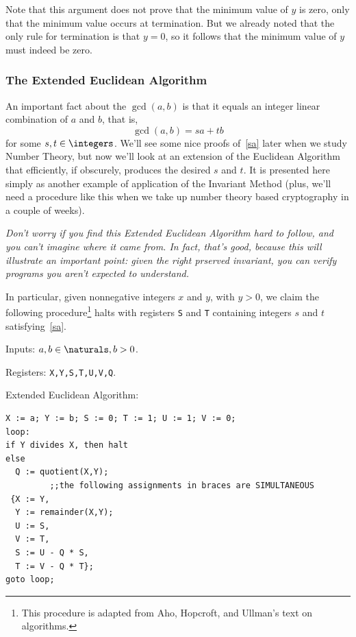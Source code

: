 Note that this argument does not prove that the minimum value of $y$ is
zero, only that the minimum value occurs at termination.  But we already
noted that the only rule for termination is that $y=0$, so it follows that
the minimum value of $y$ must indeed be zero.

\subsubsection{The Extended Euclidean Algorithm}\label{ExtendedGCD}

An important fact about the $\gcd(a,b)$ is that it equals an integer
linear combination of $a$ and $b$, that is,
\begin{equation}\label{sa}
\gcd(a,b) = sa+ tb
\end{equation}
for some $s,t \in \integers$.  We'll see some nice proofs
of~\eqref{sa} later when we study Number Theory, but now we'll look
at an extension of the Euclidean Algorithm that efficiently, if
obscurely, produces the desired $s$ and $t$.  It is presented here
simply as another example of application of the Invariant Method
(plus, we'll need a procedure like this when we take up number theory
based cryptography in a couple of weeks).

\emph{Don't worry if you find this Extended Euclidean Algorithm hard
  to follow, and you can't imagine where it came from.  In fact,
  that's good, because this will illustrate an important point: given
  the right prserved invariant, you can verify programs you aren't
  expected to understand.}

In particular, given nonnegative integers $x$ and $y$, with $y>0$, we
claim the following procedure\footnote{This procedure is adapted from Aho,
  Hopcroft, and Ullman's text on algorithms.}  halts with registers
\texttt{S} and \texttt{T} containing integers $s$ and $t$
satisfying~\eqref{sa}.

Inputs: $a,b \in \naturals, b>0$.

Registers: \texttt{X,Y,S,T,U,V,Q}.

Extended Euclidean Algorithm:
\begin{center}
\begin{verbatim}
X := a; Y := b; S := 0; T := 1; U := 1; V := 0; 
loop:
if Y divides X, then halt
else
  Q := quotient(X,Y);
         ;;the following assignments in braces are SIMULTANEOUS
 {X := Y,
  Y := remainder(X,Y);
  U := S,
  V := T,
  S := U - Q * S,
  T := V - Q * T};
goto loop;
\end{verbatim}
\end{center}

